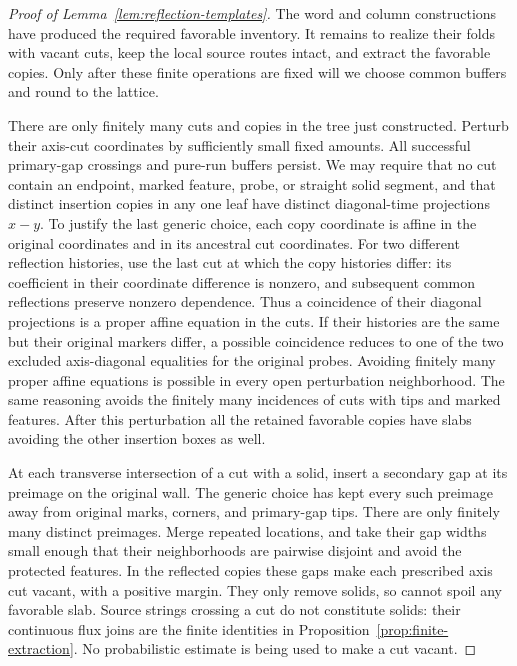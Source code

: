 \begin{proof}[Proof of Lemma~\ref{lem:reflection-templates}]
The word and column constructions have produced the required favorable
inventory. It remains to realize their folds with vacant cuts, keep
the local source routes intact, and extract the favorable copies.
Only after these finite operations are fixed will we choose common
buffers and round to the lattice.

There are only finitely many cuts and copies in the tree just
constructed. Perturb their axis-cut coordinates by sufficiently
small fixed amounts. All successful primary-gap crossings and
pure-run buffers persist. We may require that no cut contain an
endpoint, marked feature, probe, or straight solid segment, and
that distinct insertion copies in any one leaf have distinct
diagonal-time projections $x-y$. To justify the last generic
choice, each copy coordinate is affine in the original coordinates
and in its ancestral cut coordinates. For two different reflection
histories, use the last cut at which the copy histories differ:
its coefficient in their coordinate difference is nonzero, and
subsequent common reflections preserve nonzero dependence.
Thus a coincidence of their diagonal projections is a proper
affine equation in the cuts. If their histories are the same but
their original markers differ, a possible coincidence reduces to
one of the two excluded axis-diagonal equalities for the original
probes. Avoiding finitely many proper affine equations is possible
in every open perturbation neighborhood. The same reasoning
avoids the finitely many incidences of cuts with tips and marked
features. After this perturbation all the retained favorable
copies have slabs avoiding the other insertion boxes as well.

At each transverse intersection of a cut with a solid, insert a
secondary gap at its preimage on the original wall. The generic
choice has kept every such preimage away from original marks,
corners, and primary-gap tips. There are only finitely many distinct
preimages. Merge repeated locations, and take their gap widths
small enough that their neighborhoods are pairwise disjoint and
avoid the protected features. In the reflected copies these gaps
make each prescribed axis cut vacant, with a positive margin. They
only remove solids, so cannot spoil any favorable slab. Source
strings crossing a cut do not constitute solids: their continuous
flux joins are the finite identities in
Proposition~\ref{prop:finite-extraction}. No probabilistic estimate
is being used to make a cut vacant.


\end{proof}
